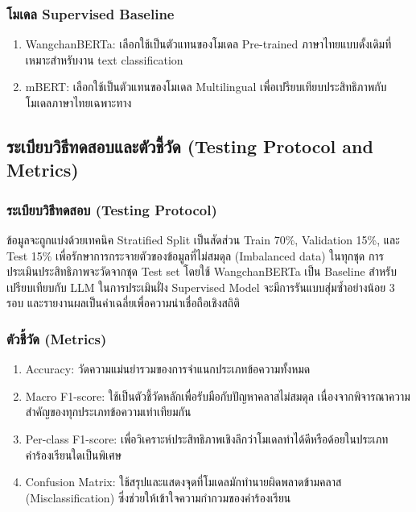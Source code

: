 \subsubsection{โมเดล Supervised Baseline}
\begin{enumerate}[label=(\arabic*)]
    \item WangchanBERTa: เลือกใช้เป็นตัวแทนของโมเดล Pre-trained ภาษาไทยแบบดั้งเดิมที่เหมาะสำหรับงาน text classification
    \item mBERT: เลือกใช้เป็นตัวแทนของโมเดล Multilingual เพื่อเปรียบเทียบประสิทธิภาพกับโมเดลภาษาไทยเฉพาะทาง
\end{enumerate}

\subsection{ระเบียบวิธีทดสอบและตัวชี้วัด (Testing Protocol and Metrics)}

\subsubsection{ระเบียบวิธีทดสอบ (Testing Protocol)}
ข้อมูลจะถูกแบ่งด้วยเทคนิค Stratified Split เป็นสัดส่วน Train 70\%, Validation 15\%, และ Test 15\% เพื่อรักษาการกระจายตัวของข้อมูลที่ไม่สมดุล (Imbalanced data) ในทุกชุด การประเมินประสิทธิภาพจะวัดจากชุด Test set โดยใช้ WangchanBERTa เป็น Baseline สำหรับเปรียบเทียบกับ LLM ในการประเมินฝั่ง Supervised Model จะมีการรันแบบสุ่มซ้ำอย่างน้อย 3 รอบ และรายงานผลเป็นค่าเฉลี่ยเพื่อความน่าเชื่อถือเชิงสถิติ

\subsubsection{ตัวชี้วัด (Metrics)}
\begin{enumerate}[label=(\arabic*)]
    \item Accuracy: วัดความแม่นยำรวมของการจำแนกประเภทข้อความทั้งหมด
    \item Macro F1-score: ใช้เป็นตัวชี้วัดหลักเพื่อรับมือกับปัญหาคลาสไม่สมดุล เนื่องจากพิจารณาความสำคัญของทุกประเภทข้อความเท่าเทียมกัน
    \item Per-class F1-score: เพื่อวิเคราะห์ประสิทธิภาพเชิงลึกว่าโมเดลทำได้ดีหรือด้อยในประเภทคำร้องเรียนใดเป็นพิเศษ
    \item Confusion Matrix: ใช้สรุปและแสดงจุดที่โมเดลมักทำนายผิดพลาดข้ามคลาส (Misclassification) ซึ่งช่วยให้เข้าใจความกำกวมของคำร้องเรียน
\end{enumerate}

